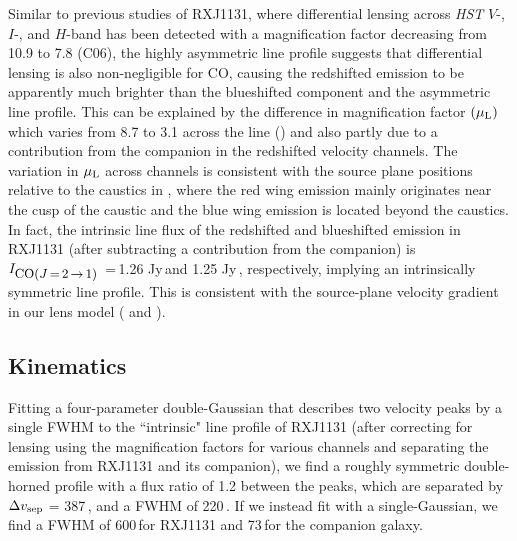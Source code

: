 \documentclass[]{emulateapj}
\begin{document}

Similar to previous studies of RXJ1131, where
differential lensing across {\it HST}
$V$-, $I$-, and $H$-band has been detected with a
magnification factor decreasing from 10.9 to 7.8 (C06),
the highly asymmetric \bco line profile suggests that
differential lensing is also non-negligible for CO,
causing the redshifted emission to be apparently much brighter than the
blueshifted component and the asymmetric line profile.   
This can be explained by the difference in magnification factor $(\mu_{\rm L})$ which
varies from 8.7 to 3.1 across the \bco line () and also partly due to a contribution from the companion in the redshifted velocity channels.
The variation in $\mu_{\rm L}$ across channels is consistent with the source plane
positions relative to the caustics in , where the red wing 
emission mainly originates near the cusp 
of the caustic and the blue wing emission is located beyond the caustics.
In fact, the intrinsic line flux of the redshifted and 
blueshifted emission in RXJ1131 (after subtracting a contribution from the companion)
is $I_{\small \mbox{CO($J$\,=\,2\,$\rightarrow$\,1) }}$\,=\,1.26 Jy\,\kms and 1.25 Jy\,\kms, respectively, 
implying an intrinsically symmetric line profile. This is consistent with the source-plane
velocity gradient in our lens model ( and ). 

\subsection{\bco Kinematics} 
Fitting a four-parameter double-Gaussian that describes two velocity peaks by a single FWHM
to the ``intrinsic" \bco line profile of RXJ1131 (after correcting for lensing using 
the magnification factors for various channels and separating the emission from RXJ1131 and its companion),
we find a roughly symmetric double-horned profile with a flux ratio of 1.2 between the peaks, which 
are separated by
$\Delta v_{\rm sep}$ = 387\,\kms, and a 
FWHM of 220\,\kms. 
If we instead fit with a single-Gaussian, we find a FWHM of 600\,\kms for RXJ1131
and 73\,\kms for the companion galaxy.
\end{document}
